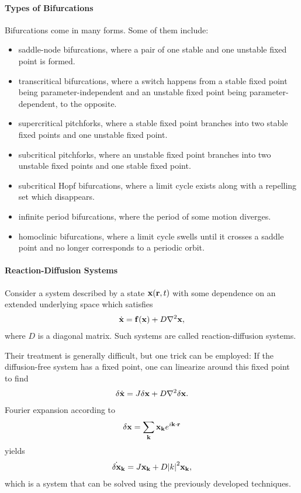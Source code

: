 \paragraph{Types of Bifurcations}
Bifurcations come in many forms. Some of them include:
\begin{itemize}
	\item saddle-node bifurcations, where a pair of one stable and one unstable fixed point is formed.
	\item transcritical bifurcations, where a switch happens from a stable fixed point being parameter-independent and an unstable fixed point being parameter-dependent, to the opposite.
	\item supercritical pitchforks, where a stable fixed point branches into two stable fixed points and one unstable fixed point.
	\item subcritical pitchforks, where an unstable fixed point branches into two unstable fixed points and one stable fixed point.
	\item subcritical Hopf bifurcations, where a limit cycle exists along with a repelling set which disappears.
	\item infinite period bifurcations, where the period of some motion diverges.
	\item homoclinic bifurcations, where a limit cycle swells until it crosses a saddle point and no longer corresponds to a periodic orbit.
\end{itemize}

\paragraph{Reaction-Diffusion Systems}
Consider a system described by a state $\vb{x}(\vb{r}, t)$ with some dependence on an extended underlying space which satisfies
\begin{align*}
	\dot{\vb{x}} = \vb{f}(\vb{x}) + D\laplacian{\vb{x}},
\end{align*}
where $D$ is a diagonal matrix. Such systems are called reaction-diffusion systems.

Their treatment is generally difficult, but one trick can be employed: If the diffusion-free system has a fixed point, one can linearize around this fixed point to find
\begin{align*}
	\delta\dot{\vb{x}} = J\delta\vb{x} + D\laplacian{\delta\vb{x}}.
\end{align*}
Fourier expansion according to
\begin{align*}
	\delta\vb{x} = \sum\limits_{\vb{k}}\vb{x}_{\vb{k}}e^{i\vb{k}\cdot\vb{r}}
\end{align*}
yields
\begin{align*}
	\dot{\delta\vb{x}}_{\vb{k}} = J\vb{x}_{\vb{k}} + D\abs{k}^{2}\vb{x}_{\vb{k}},
\end{align*}
which is a system that can be solved using the previously developed techniques.

